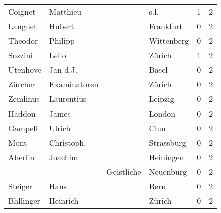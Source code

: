 \begin{tabular}{llllrr}
                  Coignet &                           Matthieu &             &                                        s.l. &          1 &         2 \\
                  Languet &                             Hubert &             &                                   Frankfurt &          0 &         2 \\
                  Theodor &                            Philipp &             &                                  Wittenberg &          0 &         2 \\
                  Sozzini &                              Lelio &             &                                      Zürich &          1 &         2 \\
                 Utenhove &                           Jan d.J. &             &                                       Basel &          0 &         2 \\
                  Zürcher &                       Examinatoren &             &                                      Zürich &          0 &         2 \\
                 Zemlinus &                         Laurentius &             &                                     Leipzig &          0 &         2 \\
                   Haddon &                              James &             &                                      London &          0 &         2 \\
                  Gampell &                             Ulrich &             &                                        Chur &          0 &         2 \\
                     Mont &                         Christoph. &             &                                  Strassburg &          0 &         2 \\
                  Aberlin &                            Joachim &             &                                   Heiningen &          0 &         2 \\
                          &                                    &  Geistliche &                                   Neuenburg &          0 &         2 \\
                  Steiger &                               Hans &             &                                        Bern &          0 &         2 \\
                Bhllinger &                           Heinrich &             &                                      Zürich &          0 &         2 \\

\end{tabular}
